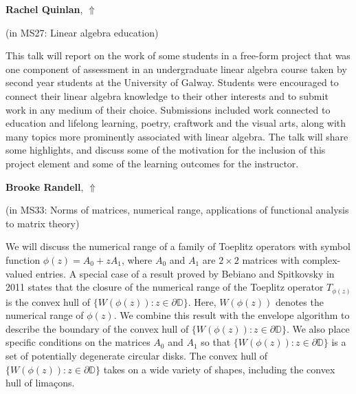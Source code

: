 \documentclass[ILAS2025-program.tex]{subfiles}
\begin{document}
\hypertarget{down0293}{}\begin{ilasabstract}
    
\textbf{Rachel Quinlan},  \hfill \hyperlink{up0293}{$\Uparrow$}
    
    
(in {\color{mstitle}MS27: Linear algebra education})
        
\mtskip
    This talk will report on the work of some students in a free-form project
that was one component of assessment in an undergraduate linear algebra course taken by second year students at the University of Galway. Students were encouraged to connect their linear algebra knowledge to their other interests and to submit work in any medium of their choice. Submissions included work connected to education and lifelong learning, poetry, craftwork and the visual arts, along with many topics more prominently associated with linear algebra. The talk will share some highlights, and discuss some of the motivation for the inclusion of this project element and some of the learning outcomes for the instructor.


\end{ilasabstract}
    

\hypertarget{down0244}{}\begin{ilasabstract}
    
\textbf{Brooke Randell},  \hfill \hyperlink{up0244}{$\Uparrow$}
    
    
(in {\color{mstitle}MS33: Norms of matrices, numerical range, applications of functional analysis to matrix theory})
        
\mtskip
    We will discuss the numerical range of a family of Toeplitz operators with symbol function \(\phi(z)=A_0+zA_1\), where \(A_0\) and \(A_1\) are \(2 \times 2\) matrices with complex-valued entries. A special case of a result proved by Bebiano and Spitkovsky in 2011 states that the closure of the numerical range of the Toeplitz operator \(T_{\phi(z)}\) is the convex hull of \(\{W(\phi(z)): z \in \partial \mathbb{D}\}\). Here, \(W(\phi(z))\) denotes the numerical range of \(\phi(z)\). We combine this result with the envelope algorithm to describe the boundary of the convex hull of \(\{W(\phi(z)): z \in \partial \mathbb{D}\}\). We also place specific conditions on the matrices \(A_0\) and \(A_1\) so that \(\{W(\phi(z)): z \in \partial \mathbb{D}\}\) is a set of potentially degenerate circular disks. The convex hull of \(\{W(\phi(z)): z \in \partial \mathbb{D}\}\) takes on a wide variety of shapes, including the convex hull of lima\c{c}ons.
\end{ilasabstract}
    
\end{document}
